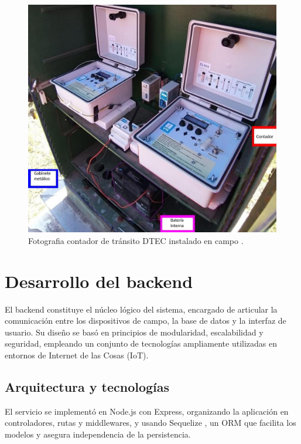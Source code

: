 \begin{itemize}
\begin{itemize}
\begin{figure}[H]
  \centering
  \includegraphics[width=1\linewidth]{./Figures/fotoGabinete.jpeg}
  \caption{Fotografia contador de tránsito DTEC instalado en campo \protect\footnotemark.}
  \label{fig:foto_gabinete}
\end{figure}

\end{itemize}

\end{itemize}

\section{Desarrollo del backend}

El backend constituye el núcleo lógico del sistema, encargado de articular la comunicación entre los dispositivos de campo, la base de datos y la interfaz de usuario. Su diseño se basó en principios de modularidad, escalabilidad y seguridad, empleando un conjunto de tecnologías ampliamente utilizadas en entornos de Internet de las Cosas (IoT).


\subsection{Arquitectura y tecnologías}

El servicio se implementó en Node.js con Express, organizando la aplicación en controladores, rutas y middlewares, y usando Sequelize \cite{sequelize}, un ORM \cite{fowler2002patterns} que facilita los modelos y asegura independencia de la persistencia.

